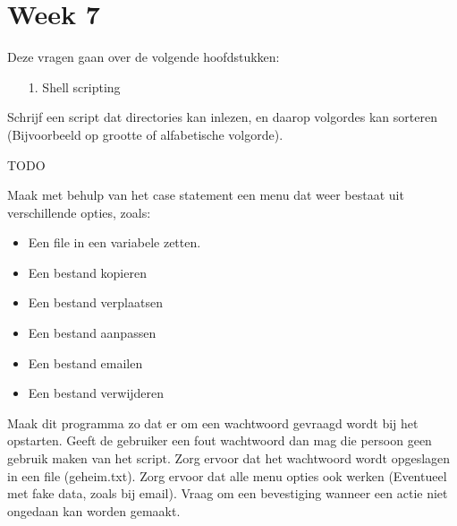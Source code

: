 %
%
%
%

\section{Week 7}
Deze vragen gaan over de volgende hoofdstukken:
\begin{itemize}
\item[1.] Shell scripting
\end{itemize}

\question[10] Schrijf een script dat directories kan inlezen, en daarop volgordes kan sorteren (Bijvoorbeeld op grootte of alfabetische volgorde).
\begin{solution}
TODO
\end{solution}

\question[50] Maak met behulp van het case statement een menu dat weer bestaat uit verschillende opties, zoals:
    \begin{itemize}
      \item Een file in een variabele zetten.
      \item Een bestand kopieren
      \item Een bestand verplaatsen
      \item Een bestand aanpassen
      \item Een bestand emailen
      \item Een bestand verwijderen
    \end{itemize}
    Maak dit programma zo dat er om een wachtwoord gevraagd wordt bij het opstarten. Geeft de gebruiker een fout wachtwoord dan mag die persoon geen gebruik maken van het script. Zorg ervoor dat het wachtwoord wordt opgeslagen in een file (geheim.txt).
    Zorg ervoor dat alle menu opties ook werken (Eventueel met fake data, zoals bij email). Vraag om een bevestiging wanneer een actie niet ongedaan kan worden gemaakt. 

